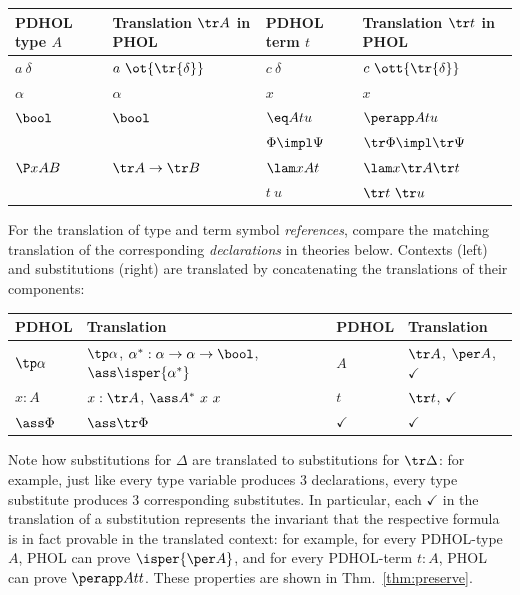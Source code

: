 \begin{center}
\begin{tabular}{|l|l||l|l|}
\hline
PDHOL type $A$ & Translation $\tr A$ in PHOL & PDHOL term $t$ & Translation $\tr t$ in PHOL\\
\hline
$a\ \delta$ & $a\ \ot{\tr{\delta}}$ & \(c \ \delta\) & \(c\ \ott{\tr{\delta}}\) \\
$\alpha$ & $\alpha$ & $x$ & $x$ \\
$\bool$ & $\bool$ & $\eq A t u$ & $\perapp Atu$ \\
                 && $\Phi\impl\Psi$ & $\tr \Phi \impl \tr \Psi$\\
$\P xAB$ & $\tr A \to \tr B$ & $\lam xAt$ & $\lam x{\tr A}{\tr t}$ \\
                            && $t\ u$ & $\tr t \ \tr u$ \\
\hline
\end{tabular}
\end{center}
For the translation of type and term symbol \emph{references}, compare the matching translation of the corresponding \emph{declarations} in theories below.
Contexts (left) and substitutions (right) are translated by concatenating the translations of their components:
\begin{center}
\begin{tabular}{|l|l||l|l|}
\hline
PDHOL & Translation & PDHOL & Translation\\
\hline
$\tp\alpha$ & $\tp\alpha$, $\alpha^*:\alpha\to\alpha\to\bool$, $\ass \isper{\alpha^*}$  & $A$   & $\tr A$, $\per A$, $\checkmark$\\
$x:A$       & $x:\tr A$, $\ass A^*\ x\ x$ & $t$   & $\tr t$, $\checkmark$\\
$\ass \Phi$    & $\ass \tr \Phi$  & $\checkmark$ & $\checkmark$ \\
\hline
\end{tabular}
\end{center}
Note how substitutions for $\Delta$ are translated to substitutions for $\tr \Delta$: for example, just like every type variable produces $3$ declarations, every type substitute produces $3$ corresponding substitutes.
In particular, each $\checkmark$ in the translation of a substitution represents the invariant that the respective formula is in fact provable in the translated context:
for example, for every PDHOL-type $A$, PHOL can prove $\isper{\per A}$, and for every PDHOL-term $t:A$, PHOL can prove $\perapp Att$.
These properties are shown in Thm.~\ref{thm:preserve}.

